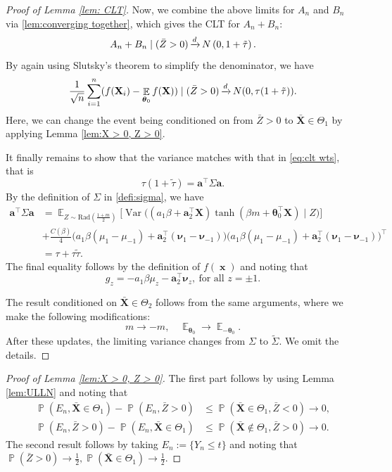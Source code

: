 \documentclass[preprint,reqno]{imsart}
\newcommand{\ttheta}{\boldsymbol{\theta}}
\DeclareMathOperator{\bx}{\textbf{x}}
\DeclareMathOperator{\xd}{\xrightarrow{\mathnormal d}}
\DeclareMathOperator{\EE}{\mathbb{E}}
\DeclareMathOperator{\Var}{Var}
\DeclareMathOperator{\PP}{\mathbb{P}}
\newcommand{\X}{\mathbf{X}}
\DeclareMathOperator{\sumin}{\sum_{\mathnormal i=1}^{\mathnormal n}}
\begin{document}
\begin{appendix}
\begin{proof}[Proof of Lemma \ref{lem: CLT}]
    Now, we combine the above limits for $A_n$ and $B_n$ via \cref{lem:converging together}, which gives %
    the CLT for $ A_n + B_n$:
    $$ A_n + B_n \mid (\bar{Z} > 0) \xd N\left(0, 1 + \tilde{\tau} \right).$$
    By again using Slutsky's theorem to simplify the denominator, we have
    $$\frac{1}{\sqrt{n}} \sumin (f(\X_i) - \EE_{\ttheta_0} f(\X)) \mid (\bar{Z} > 0) \xd N(0, \tau (1+\tilde{\tau})).$$
   Here, we can change the event being conditioned on from $\bar{Z} > 0$ to $\bar{\X} \in \Theta_1$ by applying Lemma \ref{lem:X > 0, Z > 0}.

    It finally remains to show that the variance matches with that in \eqref{eq:clt wts}, that is 
    $$\tau (1+\tilde{\tau}) = \mathbf{a}^\top \Sigma \mathbf{a}.$$
    By the definition of $\Sigma$ in \cref{defi:sigma}, we have
    \begin{align*}
    \mathbf{a}^\top \Sigma \mathbf{a}  &= \EE_{Z \sim \text{Rad}(\frac{1+m}{2})} \Big[\Var \Big( 
        (a_1 \beta + \mathbf{a}_2^\top \X)\tanh(\beta m + \ttheta_0^\top \X) \mid Z \Big) \Big] \\
    &+ \frac{C(\beta)}{4} \big( a_1 \beta(\mu_1 - \mu_{-1})+ \mathbf{a}_2^\top (\boldsymbol{\nu}_1 - \boldsymbol{\nu}_{-1})\big) \big( a_1 \beta(\mu_1 - \mu_{-1})+ \mathbf{a}_2^\top (\boldsymbol{\nu}_1 - \boldsymbol{\nu}_{-1})\big)^\top \\
    &= \tau + \tau \tilde{\tau}.
\end{align*}
The final equality follows by the definition of $f(\bx)$ and noting that $$g_z = - a_1 \beta \mu_z - \mathbf{a}_2^\top \boldsymbol{\nu}_z, ~\mbox{for all } z = \pm 1.$$

The result conditioned on $\bar{\X} \in \Theta_2$ follows from the same arguments, where we make the following modifications:
$$m \to -m, \quad \EE_{\ttheta_0} \to \EE_{-\ttheta_0}.$$
After these updates, the limiting variance changes from $\Sigma$ to $\tilde{\Sigma}$. We omit the details.
\end{proof}

\begin{proof}[Proof of Lemma \ref{lem:X > 0, Z > 0}]
The first part follows by using Lemma \ref{lem:ULLN} and noting that
\begin{align*}
    \PP(E_n, \bar{\X} \in \Theta_1) - \PP(E_n, \bar{Z}>0) &\le \PP(\bar{\X} \in \Theta_1, \bar{Z} < 0) \to 0, \\
    \PP(E_n, \bar{Z}>0) - \PP(E_n, \bar{\X} \in \Theta_1) &\le \PP(\bar{\X} \notin \Theta_1, \bar{Z} > 0) \to 0.
\end{align*}
The second result follows by taking $E_n := \{ Y_n \le t\}$ and noting that $\PP(\bar{Z} > 0) \to \frac{1}{2}, \PP(\bar{\X} \in \Theta_1) \to \frac{1}{2}$.
\end{proof}


\end{appendix}
\end{document}
